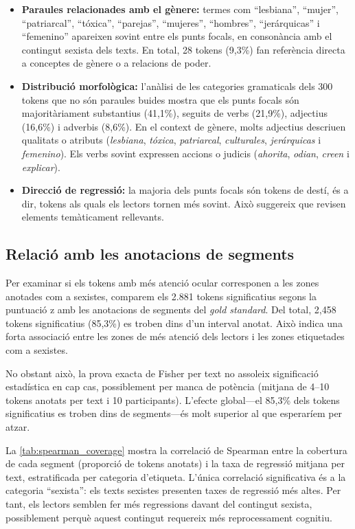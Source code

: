 \begin{itemize}
    \item \textbf{Paraules relacionades amb el gènere:} termes com ``lesbiana'', ``mujer'', ``patriarcal'', ``tóxica'', ``parejas'', ``mujeres'', ``hombres'', ``jerárquicas'' i ``femenino'' apareixen sovint entre els punts focals, en consonància amb el contingut sexista dels texts. En total, 28 tokens (9,3\%) fan referència directa a conceptes de gènere o a relacions de poder.
    \item \textbf{Distribució morfològica:} l'anàlisi de les categories gramaticals dels 300 tokens que no són paraules buides mostra que els punts focals són majoritàriament substantius (41,1\%), seguits de verbs (21,9\%), adjectius (16,6\%) i adverbis (8,6\%). En el context de gènere, molts adjectius descriuen qualitats o atributs (\textit{lesbiana}, \textit{tóxica}, \textit{patriarcal}, \textit{culturales}, \textit{jerárquicas} i \textit{femenino}). Els verbs sovint expressen accions o judicis (\textit{ahorita}, \textit{odian}, \textit{creen} i \textit{explicar}).
    \item \textbf{Direcció de regressió:} la majoria dels punts focals són tokens de destí, és a dir, tokens als quals els lectors tornen més sovint. Això suggereix que revisen elements temàticament rellevants.
\end{itemize}


\subsection{Relació amb les anotacions de segments}

Per examinar si els tokens amb més atenció ocular corresponen a les zones anotades com a sexistes, comparem els 2.881 tokens significatius segons la puntuació z amb les anotacions de segments del \textit{gold standard}.
Del total, 2,458 tokens significatius (85,3\%) es troben dins d'un interval anotat. Això indica una forta associació entre les zones de més atenció dels lectors i les zones etiquetades com a sexistes.

No obstant això, la prova exacta de Fisher per text no assoleix significació estadística en cap cas, possiblement per manca de potència (mitjana de 4--10 tokens anotats per text i 10 participants). L'efecte global---el 85,3\% dels tokens significatius es troben dins de segments---és molt superior al que esperaríem per atzar.

La \autoref{tab:spearman_coverage} mostra la correlació de Spearman entre la cobertura de cada segment (proporció de tokens anotats) i la taxa de regressió mitjana per text, estratificada per categoria d'etiqueta.
L'única correlació significativa és a la categoria ``sexista'': els texts sexistes presenten taxes de regressió més altes.
Per tant, els lectors semblen fer més regressions davant del contingut sexista, possiblement perquè aquest contingut requereix més reprocessament cognitiu.

